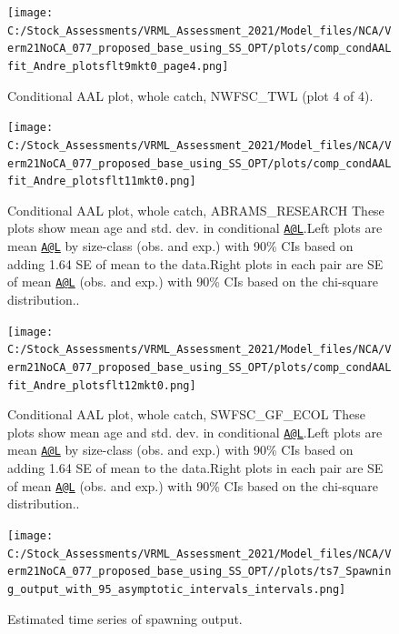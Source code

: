 \documentclass[
  english,
  a4paper,
]{article}
\begin{document}
\begin{figure}
\centering
\texttt{[image: C:/Stock\_Assessments/VRML\_Assessment\_2021/Model\_files/NCA/Verm21NoCA\_077\_proposed\_base\_using\_SS\_OPT/plots/comp\_condAALfit\_Andre\_plotsflt9mkt0\_page4.png]}
\caption{Conditional AAL plot, whole catch, NWFSC\_TWL (plot 4 of 4).\label{fig:comp_condAALfit_Andre_plotsflt9mkt0_page4}}
\end{figure}

\begin{figure}
\centering
\texttt{[image: C:/Stock\_Assessments/VRML\_Assessment\_2021/Model\_files/NCA/Verm21NoCA\_077\_proposed\_base\_using\_SS\_OPT/plots/comp\_condAALfit\_Andre\_plotsflt11mkt0.png]}
\caption{Conditional AAL plot, whole catch, ABRAMS\_RESEARCH
These plots show mean age and std. dev. in conditional \href{mailto:A@L}{\nolinkurl{A@L}}.Left plots are mean \href{mailto:A@L}{\nolinkurl{A@L}} by size-class (obs. and exp.) with 90\% CIs based on adding 1.64 SE of mean to the data.Right plots in each pair are SE of mean \href{mailto:A@L}{\nolinkurl{A@L}} (obs. and exp.) with 90\% CIs based on the chi-square distribution..\label{fig:comp_condAALfit_Andre_plotsflt11mkt0}}
\end{figure}

\begin{figure}
\centering
\texttt{[image: C:/Stock\_Assessments/VRML\_Assessment\_2021/Model\_files/NCA/Verm21NoCA\_077\_proposed\_base\_using\_SS\_OPT/plots/comp\_condAALfit\_Andre\_plotsflt12mkt0.png]}
\caption{Conditional AAL plot, whole catch, SWFSC\_GF\_ECOL
These plots show mean age and std. dev. in conditional \href{mailto:A@L}{\nolinkurl{A@L}}.Left plots are mean \href{mailto:A@L}{\nolinkurl{A@L}} by size-class (obs. and exp.) with 90\% CIs based on adding 1.64 SE of mean to the data.Right plots in each pair are SE of mean \href{mailto:A@L}{\nolinkurl{A@L}} (obs. and exp.) with 90\% CIs based on the chi-square distribution..\label{fig:comp_condAALfit_Andre_plotsflt12mkt0}}
\end{figure}

\FloatBarrier

\begin{figure}
\centering
\texttt{[image: C:/Stock\_Assessments/VRML\_Assessment\_2021/Model\_files/NCA/Verm21NoCA\_077\_proposed\_base\_using\_SS\_OPT//plots/ts7\_Spawning\_output\_with\_95\_asymptotic\_intervals\_intervals.png]}
\caption{Estimated time series of spawning output.\label{fig:ssb}}
\end{figure}
\end{document}
